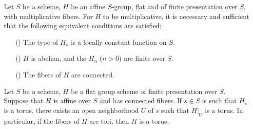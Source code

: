\begin{corollary}\label{scheme group flat fp multiplicative fiber is multiplicative iff}
Let $S$ be a scheme, $H$ be an affine $S$-group, flat and of finite presentation over $S$, with multiplicative fibers. For $H$ to be multiplicative, it is necessary and sufficient that the following equivalent conditions are satisfied:
\begin{enumerate}
    \item[(\rmnum{1})] The type of $H_s$ is a locally constant function on $S$.
    \item[(\rmnum{2})] $H$ is abelian, and the $H_n$ ($n>0$) are finite over $S$.
    \item[(\rmnum{3})] The fibers of $H$ are connected.
\end{enumerate}
\end{corollary}

\begin{corollary}\label{scheme group flat fp affine fiber torus extend nbhd}
Let $S$ be a scheme, $H$ be a flat group scheme of finite presentation over $S$. Suppose that $H$ is affine over $S$ and has connected fibers. If $s\in S$ is such that $H_s$ is a torus, there exists an open neighborhood $U$ of $s$ such that $H|_U$ is a torus. In particular, if the fibers of $H$ are tori, then $H$ is a torus.
\end{corollary}

